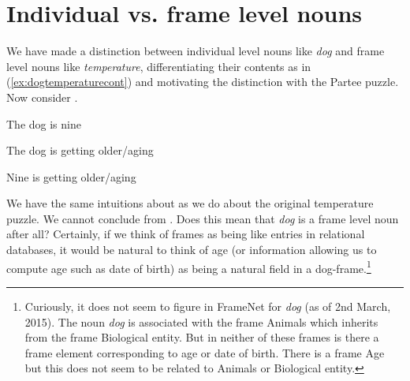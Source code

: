 \section{Individual vs. frame level nouns}
\label{sec:indvsframe}

We have made a distinction between individual level nouns like
\textit{dog} and frame level nouns like \textit{temperature}, differentiating
their contents as in (\ref{ex:dogtemperaturecont}) and motivating the
distinction with the Partee puzzle.  Now consider \nexteg{}.
\begin{ex} 
\begin{subex} 
 
\item The dog is nine 
 
\item The dog is getting older/aging

\item Nine is getting older/aging 
 
\end{subex} 
   
\end{ex} 
We have the same intuitions about \preveg{} as we do about the
original temperature puzzle.  We cannot conclude  from
.  Does this mean that \textit{dog} is a frame level noun
after all?  Certainly, if we think of frames as being like entries in
relational databases, it would be natural to think of age (or
information allowing us to compute age such as date of birth) as being
a natural field in a dog-frame.\footnote{Curiously, it does not seem
  to figure in FrameNet for \textit{dog} (as of 2nd March, 2015).  The
  noun \textit{dog} is associated with the frame Animals which
  inherits from the frame Biological entity.  But in neither of these
  frames is there a frame element corresponding to age or date of
  birth.  There is a frame Age but this does not seem to be related to
  Animals or Biological entity.} 

